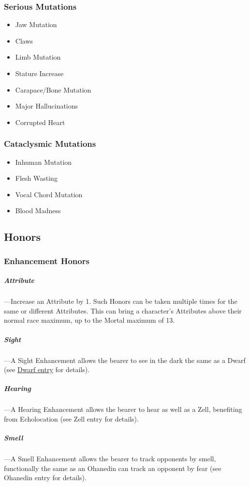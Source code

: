 \documentclass[oneside,11pt,english]{book}
\begin{document}
\subsubsection{Serious Mutations}\label{sec:Mutation-Serious}
\begin{itemize}
  [noitemsep]
\item Jaw Mutation 
\item Claws 
\item Limb Mutation 
\item Stature Increase 
\item Carapace/Bone Mutation 
\item Major Hallucinations 
\item Corrupted Heart 
\end{itemize}

\subsubsection{Cataclysmic Mutations}\label{sec:Mutation-Cataclysmic}
\begin{itemize}
  [noitemsep]
\item Inhuman Mutation
\item Flesh Wasting
\item Vocal Chord Mutation
\item Blood Madness
\end{itemize}
\subsection{Honors}
\subsubsection{Enhancement Honors}
\subparagraph{Attribute}\label{honor:Attribute}
---\quad Increase an Attribute by 1. Such Honors can be taken multiple times for the same or 
different Attributes. This can bring a character’s Attributes above their normal race maximum, up 
to the Mortal maximum of 13. 

\subparagraph{Sight}\label{honor:Sight}
---\quad A Sight Enhancement allows the bearer to see in the dark the same as a Dwarf (see \hyperref[par:Dwarf - See in Shadow]{Dwarf entry} for details).

\subparagraph{Hearing}\label{honor:Hearing}
---\quad A Hearing Enhancement allows the bearer to hear as well as a Zell, benefiting from 
Echolocation (see Zell entry for details). 

\subparagraph{Smell}\label{honor:Smell}
---\quad A Smell Enhancement allows the bearer to track opponents by smell, functionally the 
same as an Ohanedin can track an opponent by fear (see Ohanedin entry for details). 
\end{document}
